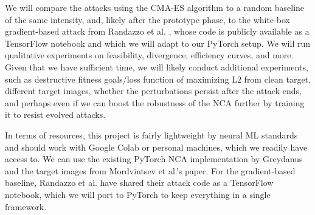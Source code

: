 \documentclass{article}
\begin{document}
We will compare the attacks using the CMA-ES algorithm to a random baseline of the same intensity, and, likely after the prototype phase, to the white-box gradient-based attack from Randazzo et al. \cite{randazzo2021adversarial}, whose code is publicly available as a TensorFlow notebook and which we will adapt to our PyTorch setup. We will run qualitative experiments on feasibility, divergence, efficiency curves, and more. Given that we have sufficient time, we will likely conduct additional experiments, such as destructive fitness goals/loss function of maximizing L2 from clean target, different target images, whether the perturbations persist after the attack ends, and perhaps even if we can boost the robustness of the NCA further by training it to resist evolved attacks.

In terms of resources, this project is fairly lightweight by neural ML standards and should work with Google Colab or personal machines, which we readily have access to. We can use the existing PyTorch NCA implementation by Greydanus and the target images from Mordvintsev et al.'s paper. For the gradient-based baseline, Randazzo et al. have shared their attack code as a TensorFlow notebook, which we will port to PyTorch to keep everything in a single framework.
	


\end{document}
